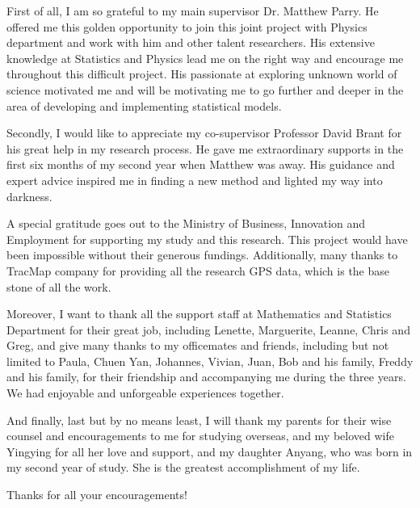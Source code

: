 First of all, I am so grateful to my main supervisor Dr. Matthew Parry. He offered me this golden opportunity to join this joint project with Physics department and work with him and other talent researchers. His extensive knowledge at Statistics and Physics lead me on the right way and encourage me throughout this difficult project. His passionate at exploring unknown world of science motivated me and will be motivating me to go further and deeper in the area of developing and implementing statistical models.  

Secondly, I would like to appreciate my co-supervisor Professor David Brant for his great help in my research process. He gave me extraordinary supports in the first six months of my second year when Matthew was away. His guidance and expert advice inspired me in finding a new method and lighted my way into darkness. 

A special gratitude goes out to the Ministry of Business, Innovation and Employment for supporting my study and this research. This project would have been impossible without their generous fundings. Additionally, many thanks to TracMap company for providing all the research GPS data, which is the base stone of all the work. 

Moreover, I want to thank all the support staff at Mathematics and Statistics Department for their great job, including Lenette, Marguerite, Leanne, Chris and Greg, and give many thanks to my officemates and friends, including but not limited to Paula, Chuen Yan, Johannes, Vivian, Juan, Bob and his family, Freddy and his family, for their friendship and accompanying me during the three years. We had enjoyable and unforgeable experiences together. 

And finally, last but by no means least, I will thank my parents for their wise counsel and encouragements to me for studying overseas, and my beloved wife Yingying for all her love and support, and my daughter Anyang, who was born in my second year of study. She is the greatest accomplishment of my life.

Thanks for all your encouragements! 

